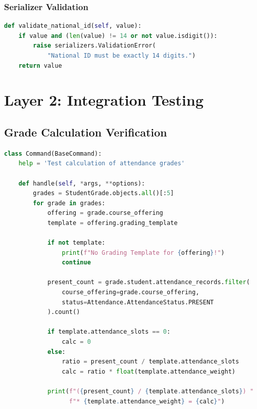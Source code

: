 \subsubsection{Serializer Validation}

\begin{lstlisting}[language=Python, caption=National ID Validation (users/serializers.py)]
def validate_national_id(self, value):
    if value and (len(value) != 14 or not value.isdigit()):
        raise serializers.ValidationError(
            "National ID must be exactly 14 digits.")
    return value
\end{lstlisting}

\section{Layer 2: Integration Testing}
\label{sec:layer2-integration}

\subsection{Grade Calculation Verification}

\begin{lstlisting}[language=Python, caption=Grade Calculation Test Command]
class Command(BaseCommand):
    help = 'Test calculation of attendance grades'

    def handle(self, *args, **options):
        grades = StudentGrade.objects.all()[:5]
        for grade in grades:
            offering = grade.course_offering
            template = offering.grading_template
            
            if not template:
                print(f"No Grading Template for {offering}!")
                continue
            
            present_count = grade.student.attendance_records.filter(
                course_offering=grade.course_offering,
                status=Attendance.AttendanceStatus.PRESENT
            ).count()
            
            if template.attendance_slots == 0:
                calc = 0
            else:
                ratio = present_count / template.attendance_slots
                calc = ratio * float(template.attendance_weight)
            
            print(f"({present_count} / {template.attendance_slots}) "
                  f"* {template.attendance_weight} = {calc}")
\end{lstlisting}

